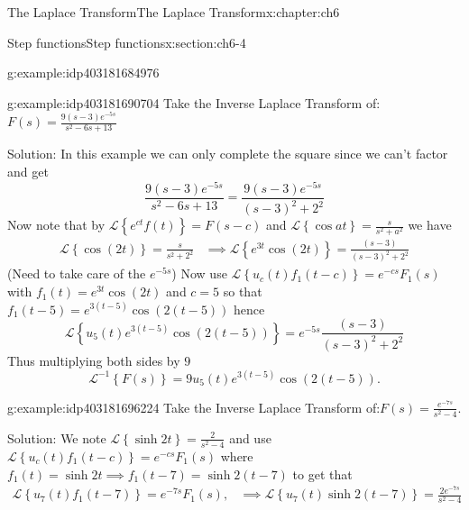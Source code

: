 \documentclass[oneside,10pt,]{book}
\numberwithin{equation}{section}
\numberwithin{equation}{section}
\newcommand{\amp}{&}
\begin{document}
\begin{chapterptx}{The Laplace Transform}{}{The Laplace Transform}{}{}{x:chapter:ch6}
\begin{sectionptx}{Step functions}{}{Step functions}{}{}{x:section:ch6-4}
\begin{example}{}{g:example:idp403181684976}
\begin{equation*}
\end{equation*}
%
\end{example}
\begin{example}{}{g:example:idp403181690704}%
Take the Inverse Laplace Transform of:\({\displaystyle F(s)=\frac{9\left(s-3\right)e^{-5s}}{s^{2}-6s+13}}\)%
\par
Solution: In this example we can only complete the square since we can't factor and get%
\begin{equation*}
\frac{9\left(s-3\right)e^{-5s}}{s^{2}-6s+13}=\frac{9\left(s-3\right)e^{-5s}}{\left(s-3\right)^{2}+2^{2}}
\end{equation*}
Now note that by \(\mathcal{L}\left\{ e^{ct}f\left(t\right)\right\} =F(s-c)\) and \(\mathcal{L}\left\{ \cos at\right\} =\frac{s}{s^{2}+a^{2}}\) we have%
\begin{align*}
\mathcal{L}\left\{ \cos\left(2t\right)\right\} =\frac{s}{s^{2}+2^{2}} \amp \implies\mathcal{L}\left\{ e^{3t}\cos\left(2t\right)\right\} =\frac{(s-3)}{(s-3)^{2}+2^{2}}
\end{align*}
(Need to take care of the \(e^{-5s}\)) Now use \(\mathcal{L}\left\{ u_{c}(t)f_{1}\left(t-c\right)\right\} =e^{-cs}F_{1}(s)\) with \(f_{1}(t)=e^{3t}\cos\left(2t\right)\) and \(c=5\) so that \(f_{1}(t-5)=e^{3(t-5)}\cos\left(2\left(t-5\right)\right)\) hence%
\begin{equation*}
\mathcal{L}\left\{ u_{5}(t)e^{3(t-5)}\cos\left(2\left(t-5\right)\right)\right\} =e^{-5s}\frac{(s-3)}{(s-3)^{2}+2^{2}}
\end{equation*}
Thus multiplying both sides by \(9\)%
\begin{equation*}
\mathcal{L}^{-1}\left\{ F(s)\right\} =9u_{5}(t)e^{3(t-5)}\cos\left(2\left(t-5\right)\right).
\end{equation*}
%
\end{example}
\begin{example}{}{g:example:idp403181696224}%
Take the Inverse Laplace Transform of:\({\displaystyle F(s)=\frac{e^{-7s}}{s^{2}-4}}\).%
\par
Solution: We note \(\mathcal{L}\left\{ \sinh2t\right\} =\frac{2}{s^{2}-4}\) and use \(\mathcal{L}\left\{ u_{c}(t)f_{1}\left(t-c\right)\right\} =e^{-cs}F_{1}(s)\) where \(f_{1}(t)=\sinh2t\implies f_{1}(t-7)=\sinh2\left(t-7\right)\) to get that%
\begin{align*}
\mathcal{L}\left\{ u_{7}(t)f_{1}\left(t-7\right)\right\} =e^{-7s}F_{1}(s), \amp \implies\mathcal{L}\left\{ u_{7}(t)\sinh2\left(t-7\right)\right\} =\frac{2e^{-7s}}{s^{2}-4}\\

\end{align*}
\end{example}
\end{sectionptx}
\end{chapterptx}
\end{document}
